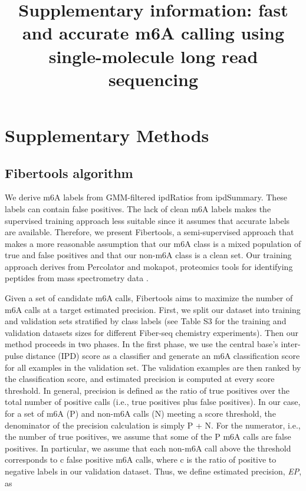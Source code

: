 \documentclass{article}
\date{}
\title{Supplementary information: fast and accurate m6A calling using single-molecule long read sequencing}
\begin{document}
\maketitle

\section{Supplementary Methods}
\subsection{Fibertools algorithm}
We derive m6A labels from GMM-filtered ipdRatios from ipdSummary. These labels can contain false positives. The lack of clean m6A labels makes the supervised training approach less suitable since it assumes that accurate labels are available. Therefore, we present Fibertools, a semi-supervised approach that makes a more reasonable assumption that our m6A class is a mixed population of true and false positives and that our non-m6A class is a clean set. Our training approach derives from Percolator and mokapot, proteomics tools for identifying peptides from mass spectrometry data \cite{fondrie2021mokapot,kall2007semi}.  

Given a set of candidate m6A calls, Fibertools aims to maximize the number of m6A calls at a target estimated precision. First, we split our dataset into training and validation sets stratified by class labels (see Table S3 for the training and validation datasets sizes for different Fiber-seq chemistry experiments). Then our method proceeds in two phases. In the first phase, we use the central base's inter-pulse distance (IPD) score as a classifier and generate an m6A classification score for all examples in the validation set. The validation examples are then ranked by the classification score, and estimated precision is computed at every score threshold.  In general, precision is defined as the ratio of true positives over the total number of positive calls (i.e., true positives plus false positives). In our case, for a set of m6A (P) and non-m6A calls (N) meeting a score threshold, the denominator of the precision calculation is simply P + N. For the numerator, i.e., the number of true positives, we assume that some of the P m6A calls are false positives. In particular, we assume that each non-m6A call above the threshold corresponds to c false positive m6A calls, where c is the ratio of positive to negative labels in our validation dataset. Thus, we define estimated precision, \textit{EP}, as
\end{document}
